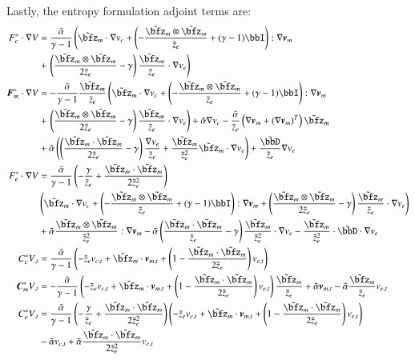 \documentclass[preprint,12pt]{elsarticle}
\begin{document}
Lastly, the entropy formulation adjoint terms are:
\begin{align*}
F^*_c\cdot\Grad V&=\frac{\tilde\alpha}{\gamma-1}\left(
\tilde\bfz_m\cdot\Grad v_c
+\LRp{-\frac{\tilde\bfz_m\otimes\tilde\bfz_m}{\tilde z_e}+(\gamma-1)\bbI}:\Grad\bfv_m\right.\\
&+\left.
\LRp{\frac{\tilde\bfz_m\otimes\tilde\bfz_m}{2\tilde z_e}-\gamma}\frac{\tilde\bfz_m}{\tilde z_e}\cdot\Grad v_e
\right)
\\
\bfF^*_m\cdot\Grad V&=-\frac{\tilde\alpha}{\gamma-1}\frac{\tilde\bfz_m}{\tilde z_e}\left(
\tilde\bfz_m\cdot\Grad v_c
+\LRp{-\frac{\tilde\bfz_m\otimes\tilde\bfz_m}{\tilde z_e}+(\gamma-1)\bbI}:\Grad\bfv_m
\right.\\
&+\left.
\LRp{\frac{\tilde\bfz_m\otimes\tilde\bfz_m}{2\tilde z_e}-\gamma}\frac{\tilde\bfz_m}{\tilde z_e}\cdot\Grad v_e
\right)
+\tilde\alpha\Grad v_c
-\frac{\tilde\alpha}{\tilde z_e}\LRp{\Grad\bfv_m+(\Grad\bfv_m)^T}\tilde\bfz_m\\
&+\tilde\alpha\LRp{\LRp{\frac{\tilde\bfz_m\cdot\tilde\bfz_m}{2\tilde z_e}-\gamma}\frac{\Grad v_e}{\tilde z_e}
+\frac{\tilde\bfz_m}{\tilde z_e^2}\tilde\bfz_m\cdot\Grad v_e}
+\frac{\tilde\bbD}{\tilde z_e}\Grad v_e
\\
F^*_e\cdot\Grad V&=
\frac{\tilde\alpha}{\gamma-1}\LRp{-\frac{\gamma}{\tilde z_e}
+\frac{\tilde\bfz_m\cdot\tilde\bfz_m}{2\tilde z_e^2}}\\
&\LRp{
\tilde\bfz_m\cdot\Grad v_c
+\LRp{-\frac{\tilde\bfz_m\otimes\tilde\bfz_m}{\tilde z_e}+(\gamma-1)\bbI}:\Grad\bfv_m
+
\LRp{\frac{\tilde\bfz_m\otimes\tilde\bfz_m}{2\tilde z_e}-\gamma}\frac{\tilde\bfz_m}{\tilde z_e}\cdot\Grad v_e
}\\
&+\tilde\alpha\frac{\tilde\bfz_m\otimes\tilde\bfz_m}{\tilde z_e^2}:\Grad\bfv_m
-\tilde\alpha\LRp{\frac{\tilde\bfz_m\cdot\tilde\bfz_m}{\tilde z_e}-\gamma}\frac{\tilde\bfz_m}{\tilde z_e^2}\cdot\Grad v_e
-\frac{\tilde\bfz_m}{\tilde z_e^2}\cdot\tilde\bbD\cdot\Grad v_e
\\
%
C^*_cV_{,t}&=
\frac{\tilde\alpha}{\gamma-1}\LRp{-\tilde z_e v_{c,t}+\tilde\bfz_m\cdot\bfv_{m,t}
+\LRp{1-\frac{\tilde\bfz_m\cdot\tilde\bfz_m}{2\tilde z_e}}v_{e,t}}
\\
\bfC^*_mV_{,t}&=
-\frac{\tilde\alpha}{\gamma-1}\LRp{-\tilde z_e v_{c,t}+\tilde\bfz_m\cdot\bfv_{m,t}
+\LRp{1-\frac{\tilde\bfz_m\cdot\tilde\bfz_m}{2\tilde z_e}}v_{e,t}}\frac{\tilde\bfz_m}{\tilde z_e}
+\tilde\alpha\bfv_{m,t}-\tilde\alpha\frac{\tilde\bfz_m}{\tilde z_e}v_{e,t}
\\
C^*_eV_{,t}&=
\frac{\tilde\alpha}{\gamma-1}\LRp{-\frac{\gamma}{\tilde z_e}
+\frac{\tilde\bfz_m\cdot\tilde\bfz_m}{2\tilde z_e^2}}
\LRp{-\tilde z_e v_{c,t}+\tilde\bfz_m\cdot\bfv_{m,t}
+\LRp{1-\frac{\tilde\bfz_m\cdot\tilde\bfz_m}{2\tilde z_e}}v_{e,t}}\\
&-\tilde\alpha v_{c,t}
+\tilde\alpha\frac{\tilde\bfz_m\cdot\tilde\bfz_m}{2\tilde z_e^2} v_{e,t}
\\
\end{align*}
\end{document}

